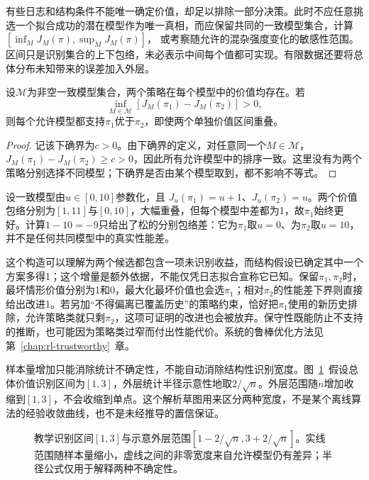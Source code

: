 有些日志和结构条件不能唯一确定价值，却足以排除一部分决策。此时不应任意挑选一个拟合成功的潜在模型作为唯一真相，而应保留共同的一致模型集合，计算
$[\inf_MJ_M(\pi),\sup_MJ_M(\pi)]$，
或考察随允许的混杂强度变化的敏感性范围。区间只是识别集合的上下包络，未必表示中间每个值都可实现。有限数据还要将总体分布未知带来的误差加入外层。

\begin{theorem}[共同模型下的性能差确定排序]
  \label{thm:rl-information-partial-order}
  设$\mathcal M$为非空一致模型集合，两个策略在每个模型中的价值均存在。若
  \[
    \inf_{M\in\mathcal M}
          [J_M(\pi_1)-J_M(\pi_2)]>0,
  \]
  则每个允许模型都支持$\pi_1$优于$\pi_2$，即使两个单独价值区间重叠。
\end{theorem}

\begin{proof}
  记该下确界为$c>0$。由下确界的定义，对任意同一个$M\in\mathcal M$，
  $J_M(\pi_1)-J_M(\pi_2)\geq c>0$，因此所有允许模型中的排序一致。这里没有为两个策略分别选择不同模型；下确界是否由某个模型取到，都不影响不等式。
\end{proof}

\begin{example}
  \label{ex:rl-information-partial-order}
  设一致模型由$u\in[0,10]$参数化，且
  $J_u(\pi_1)=u+1$、$J_u(\pi_2)=u$。两个价值包络分别为$[1,11]$与$[0,10]$，大幅重叠，但每个模型中差都为1，故$\pi_1$始终更好。计算$1-10=-9$只给出了松的分别包络差：它为$\pi_1$取$u=0$、为$\pi_2$取$u=10$，并不是任何共同模型中的真实性能差。
\end{example}

这个构造可以理解为两个候选都包含一项未识别收益，而结构假设已确定其中一个方案多得1；这个增量是额外依据，不能仅凭日志拟合宣称它已知。保留$\pi_1,\pi_2$时，最坏情形价值分别为1和0，最大化最坏价值也会选$\pi_1$；相对$\pi_2$的性能差下界则直接给出改进1。若另加“不得偏离已覆盖历史”的策略约束，恰好把$\pi_1$使用的新历史排除，允许策略类就只剩$\pi_2$，这项可证明的改进也会被放弃。保守性既能防止不支持的推断，也可能因为策略类过窄而付出性能代价。系统的鲁棒优化方法见第~\ref{chap:rl-trustworthy}~章。

样本量增加只能消除统计不确定性，不能自动消除结构性识别宽度。图~\ref{fig:rl-information-identification-width}~假设总体价值识别区间为$[1,3]$，外层统计半径示意性地取$2/\sqrt n$。外层范围随$n$增加收缩到$[1,3]$，不会收缩到单点。这个解析草图用来区分两种宽度，不是某个离线算法的经验收敛曲线，也不是未经推导的置信保证。

\begin{figure}[htbp]
  \centering
  
  \caption{教学识别区间$[1,3]$与示意外层范围$[1-2/\sqrt n,3+2/\sqrt n]$。实线范围随样本量缩小，虚线之间的非零宽度来自允许模型仍有差异；半径公式仅用于解释两种不确定性。}
  \label{fig:rl-information-identification-width}
\end{figure}

